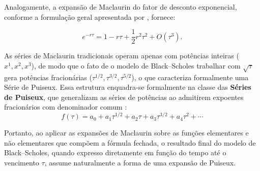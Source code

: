 Analogamente, a expansão de Maclaurin do fator
de desconto exponencial, conforme a formulação
geral apresentada por \cite{strang2016}, fornece:

\begin{equation}
    e^{-r\tau}
    = 1-r\tau
    +\frac{1}{2}r^2\tau^2
    +O(\tau^3).
\end{equation}

As séries de Maclaurin tradicionais operam apenas com potências inteiras ($x^1, x^2, x^3$), de modo que o fato de o modelo de Black--Scholes trabalhar com $\sqrt{\tau}$ gera potências fracionárias ($\tau^{1/2}, \tau^{3/2}, \tau^{5/2}$), o que caracteriza formalmente uma Série de Puiseux. Essa estrutura enquadra-se formalmente na classe das \textbf{Séries de Puiseux}, que generalizam as séries de potências ao admitirem expoentes fracionários com denominador comum \cite{eberl2021}:
\begin{equation}
f(\tau) = a_0 + a_1\tau^{1/2} + a_2\tau + a_3\tau^{3/2} + a_4\tau^2 + \cdots
\end{equation}

Portanto, ao aplicar as expansões de Maclaurin sobre as funções elementares e não elementares que compõem a fórmula fechada, o resultado final do modelo de Black--Scholes, quando expresso diretamente em função do tempo até o vencimento $\tau$, assume naturalmente a forma de uma expansão de Puiseux.
